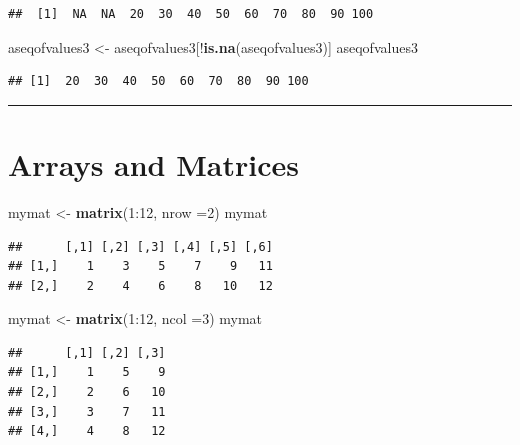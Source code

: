\documentclass[]{book}
\newenvironment{Shaded}{\begin{snugshade}}{\end{snugshade}}
\newcommand{\KeywordTok}[1]{\textcolor[rgb]{0.13,0.29,0.53}{\textbf{{#1}}}}
\newcommand{\DataTypeTok}[1]{\textcolor[rgb]{0.13,0.29,0.53}{{#1}}}
\newcommand{\DecValTok}[1]{\textcolor[rgb]{0.00,0.00,0.81}{{#1}}}
\newcommand{\StringTok}[1]{\textcolor[rgb]{0.31,0.60,0.02}{{#1}}}
\newcommand{\NormalTok}[1]{{#1}}
\begin{document}
\begin{verbatim}
##  [1]  NA  NA  20  30  40  50  60  70  80  90 100
\end{verbatim}

\begin{Shaded}
\begin{Highlighting}[]
\NormalTok{aseqofvalues3 <-}\StringTok{ }\NormalTok{aseqofvalues3[!}\KeywordTok{is.na}\NormalTok{(aseqofvalues3)]}
\NormalTok{aseqofvalues3}
\end{Highlighting}
\end{Shaded}

\begin{verbatim}
## [1]  20  30  40  50  60  70  80  90 100
\end{verbatim}

\begin{center}\rule{0.5\linewidth}{\linethickness}\end{center}

\section{Arrays and Matrices}\label{arrays-and-matrices}

\begin{Shaded}
\begin{Highlighting}[]
\NormalTok{mymat <-}\StringTok{ }\KeywordTok{matrix}\NormalTok{(}\DecValTok{1}\NormalTok{:}\DecValTok{12}\NormalTok{, }\DataTypeTok{nrow =}\DecValTok{2}\NormalTok{)}
\NormalTok{mymat}
\end{Highlighting}
\end{Shaded}

\begin{verbatim}
##      [,1] [,2] [,3] [,4] [,5] [,6]
## [1,]    1    3    5    7    9   11
## [2,]    2    4    6    8   10   12
\end{verbatim}

\begin{Shaded}
\begin{Highlighting}[]
\NormalTok{mymat <-}\StringTok{ }\KeywordTok{matrix}\NormalTok{(}\DecValTok{1}\NormalTok{:}\DecValTok{12}\NormalTok{, }\DataTypeTok{ncol =}\DecValTok{3}\NormalTok{)}
\NormalTok{mymat}
\end{Highlighting}
\end{Shaded}

\begin{verbatim}
##      [,1] [,2] [,3]
## [1,]    1    5    9
## [2,]    2    6   10
## [3,]    3    7   11
## [4,]    4    8   12
\end{verbatim}
\end{document}
